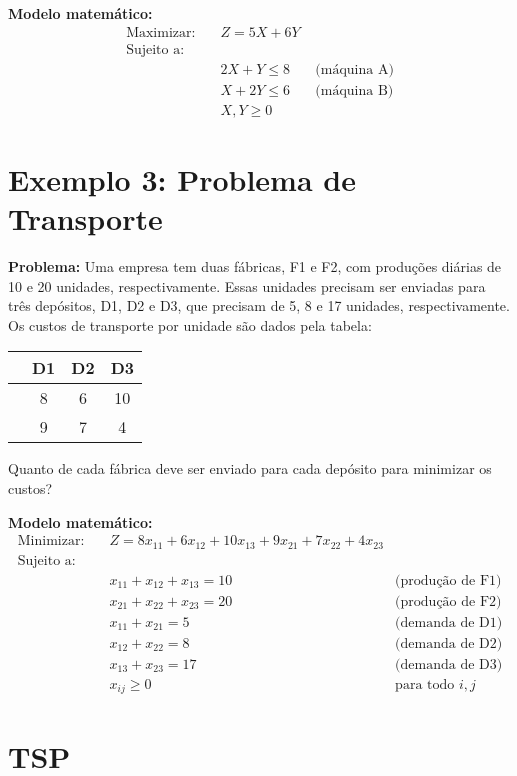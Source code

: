 \documentclass[]{article}
\theoremstyle{definition}
\theoremstyle{definition}
\begin{document}
\textbf{Modelo matemático:}
\begin{align*}
\text{Maximizar:} \quad & Z = 5X + 6Y \\
\text{Sujeito a:} \\
& 2X + Y \leq 8 \quad & \text{(máquina A)} \\
& X + 2Y \leq 6 \quad & \text{(máquina B)} \\
& X, Y \geq 0
\end{align*}

\section*{Exemplo 3: Problema de Transporte}

\textbf{Problema:} 
Uma empresa tem duas fábricas, F1 e F2, com produções diárias de 10 e 20 unidades, respectivamente. Essas unidades precisam ser enviadas para três depósitos, D1, D2 e D3, que precisam de 5, 8 e 17 unidades, respectivamente. Os custos de transporte por unidade são dados pela tabela:
\begin{center}
	\begin{tabular}{c|ccc}
		& D1 & D2 & D3 \\
		\hline
		\text{F1} & 8 & 6 & 10 \\
		\text{F2} & 9 & 7 & 4 \\
	\end{tabular}
\end{center}
Quanto de cada fábrica deve ser enviado para cada depósito para minimizar os custos?

\textbf{Modelo matemático:}
\begin{align*}
\text{Minimizar:} \quad & Z = 8x_{11} + 6x_{12} + 10x_{13} + 9x_{21} + 7x_{22} + 4x_{23} \\
\text{Sujeito a:} \\
& x_{11} + x_{12} + x_{13} = 10 \quad & \text{(produção de F1)} \\
& x_{21} + x_{22} + x_{23} = 20 \quad & \text{(produção de F2)} \\
& x_{11} + x_{21} = 5 \quad & \text{(demanda de D1)} \\
& x_{12} + x_{22} = 8 \quad & \text{(demanda de D2)} \\
& x_{13} + x_{23} = 17 \quad & \text{(demanda de D3)} \\
& x_{ij} \geq 0 \quad & \text{para todo } i,j
\end{align*}

\section{TSP}
\end{document}
